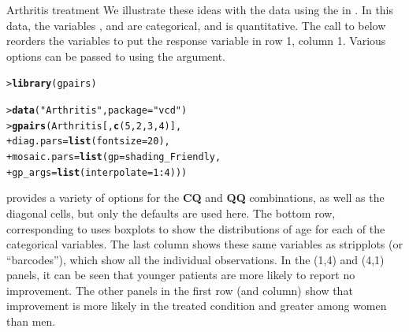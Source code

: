 \documentclass[10pt,krantz2]{krantz}\usepackage[]{graphicx}\usepackage[]{color}
\makeatletter
\newcommand{\hlnum}[1]{\textcolor[rgb]{0.686,0.059,0.569}{#1}}%
\newcommand{\hlstr}[1]{\textcolor[rgb]{0.192,0.494,0.8}{#1}}%
\newcommand{\hlopt}[1]{\textcolor[rgb]{0,0,0}{#1}}%
\newcommand{\hlstd}[1]{\textcolor[rgb]{0.345,0.345,0.345}{#1}}%
\newcommand{\hlkwc}[1]{\textcolor[rgb]{0.333,0.667,0.333}{#1}}%
\newcommand{\hlkwd}[1]{\textcolor[rgb]{0.737,0.353,0.396}{\textbf{#1}}}%
\newenvironment{kframe}{%
 \def\at@end@of@kframe{}%
 \ifinner\ifhmode%
  \def\at@end@of@kframe{\end{minipage}}%
  \begin{minipage}{\columnwidth}%
 \fi\fi%
 \def\FrameCommand##1{\hskip\@totalleftmargin \hskip-\fboxsep
 \colorbox{shadecolor}{##1}\hskip-\fboxsep
     \hskip-\linewidth \hskip-\@totalleftmargin \hskip\columnwidth}%
 \MakeFramed {\advance\hsize-\width
   \@totalleftmargin\z@ \linewidth\hsize
   \@setminipage}}%
 {\par\unskip\endMakeFramed%
 \at@end@of@kframe}
\newenvironment{knitrout}{}{} %
\renewenvironment{knitrout}{\small\renewcommand{\baselinestretch}{.85}}{} %
\makeatother
\begin{document}
\begin{Example}{Arthritis treatment}
We illustrate these ideas with the  data using the
 in .
In this data, the variables ,  and  are
categorical, and  is quantitative.
The call to  below reorders the variables to put the response variable
 in row 1, column 1. Various options can be passed to 
using the  argument.
\begin{knitrout}
\color{fgcolor}\begin{kframe}
\begin{alltt}
\hlstd{> }\hlkwd{library}\hlstd{(gpairs)}
\end{alltt}


{\ttfamily\noindent\bfseries\color{errorcolor}{Error in library(gpairs): there is no package called 'gpairs'}}\begin{alltt}
\hlstd{> }\hlkwd{data}\hlstd{(}\hlstr{"Arthritis"}\hlstd{,} \hlkwc{package} \hlstd{=} \hlstr{"vcd"}\hlstd{)}
\hlstd{> }\hlkwd{gpairs}\hlstd{(Arthritis[,}\hlkwd{c}\hlstd{(}\hlnum{5}\hlstd{,} \hlnum{2}\hlstd{,} \hlnum{3}\hlstd{,} \hlnum{4}\hlstd{)],}
\hlstd{+ }       \hlkwc{diag.pars} \hlstd{=} \hlkwd{list}\hlstd{(}\hlkwc{fontsize} \hlstd{=} \hlnum{20}\hlstd{),}
\hlstd{+ }       \hlkwc{mosaic.pars} \hlstd{=} \hlkwd{list}\hlstd{(}\hlkwc{gp} \hlstd{= shading_Friendly,}
\hlstd{+ }                          \hlkwc{gp_args} \hlstd{=} \hlkwd{list}\hlstd{(}\hlkwc{interpolate} \hlstd{=} \hlnum{1} \hlopt{:} \hlnum{4}\hlstd{)))}
\end{alltt}


{\ttfamily\noindent\bfseries{}}\end{kframe}
\end{knitrout}


 provides a variety of options for the \textbf{CQ} and \textbf{QQ}
combinations, as well as the diagonal cells,
but only the defaults are used here.  The bottom row, corresponding to 
uses boxplots to show the distributions of age for each of the categorical variables.
The last column shows these same variables as stripplots (or ``barcodes''),
which show all the individual observations.  In the (1,4) and (4,1) panels, it can
be seen that younger patients are more likely to report no improvement.
The other panels in the first row (and column) show that improvement is more
likely in the treated condition and greater among women than men.
\end{Example}
\end{document}
